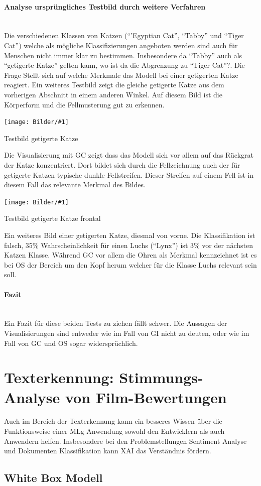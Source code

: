 \documentclass[
  12pt, %
  a4paper, %
  oneside, %
  openany, 
  numbers=noenddot, %
  BCOR=5mm, %
  parskip=half*, %
  thesis, %
]{bfhbook}
\newcommand{\parag}[1]{\paragraph*{#1}\mbox{}\\}
\newcommand{\imgText}[3]{
\begin{center}
    \begin{minipage}[t]{0.6\textwidth}
    		\vspace{0pt}
		\texttt{[image: Bilder/\#1]}
		\caption{#2}
	\end{minipage}\hfill
    \begin{minipage}[t]{0.4\textwidth}
    		\vspace{5pt}
  		#3
    \end{minipage}
\end{center}
}
\begin{document}
\parag{Analyse ursprüngliches Testbild durch weitere Verfahren}
Die verschiedenen Klassen von Katzen  (``'Egyptian Cat'', ``Tabby'' und ``Tiger Cat'') welche als mögliche Klassifizierungen angeboten werden sind auch für Menschen nicht immer klar zu bestimmen. Insbesondere da ``Tabby'' auch als ``getigerte Katze'' gelten kann, wo ist da die Abgrenzung zu ``Tiger Cat''?. Die Frage Stellt sich auf welche Merkmale das Modell bei einer getigerten Katze reagiert. Ein weiteres Testbild zeigt die gleiche getigerte Katze aus dem vorherigen Abschnitt in einem anderen Winkel. Auf diesem Bild ist die Körperform und die Fellmusterung gut zu erkennen.

\imgText{Mira-Classification-2-only-tabby.png}{
Testbild getigerte Katze}{Die Visualisierung mit \Gls{GC} zeigt dass das Modell sich vor allem auf das Rückgrat der Katze konzentriert. Dort bildet sich durch die Fellzeichnung auch der für getigerte Katzen typische dunkle Fellstreifen. Dieser Streifen auf einem Fell ist in diesem Fall das relevante Merkmal des Bildes.
}

\imgText{Merlin-Classification.png}{Testbild getigerte Katze frontal}{
Ein weiteres Bild einer getigerten Katze, diesmal von vorne.
\break\break
Die Klassifikation ist falsch, 35\% Wahrscheinlichkeit für einen Luchs (``Lynx'') ist 3\% vor der nächsten Katzen Klasse. Während \Gls{GC} vor allem die Ohren als Merkmal kennzeichnet ist es bei \Gls{OS} der Bereich um den Kopf herum welcher für die Klasse Luchs relevant sein soll.
}

\parag{Fazit}
Ein Fazit für diese beiden Tests zu ziehen fällt schwer. Die Aussagen der Visualisierungen sind entweder wie im Fall von \Gls{GI} nicht zu deuten, oder wie im Fall von \Gls{GC} und \Gls{OS} sogar widersprüchlich.

\section{Texterkennung: Stimmungs-Analyse von Film-Bewertungen}
Auch im Bereich der Texterkennung kann ein besseres Wissen über die Funktionsweise einer \Gls{MLg} Anwendung sowohl den Entwicklern als auch Anwendern helfen. Insbesondere bei den Problemstellungen Sentiment Analyse und Dokumenten Klassifikation kann \Gls{XAI} das Verständnis fördern.

\subsection{White Box Modell}
\label{eli5MovieReview}
\end{document}
